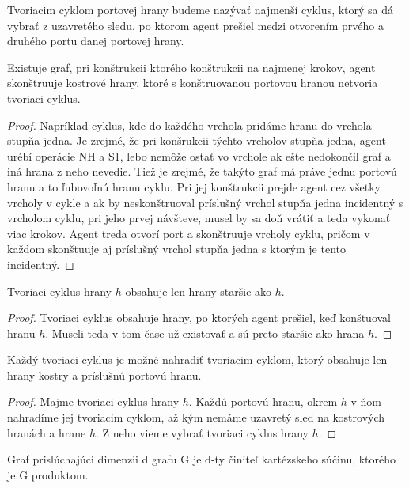 \begin{ozn}
Tvoriacim cyklom portovej hrany budeme nazývať najmenší cyklus, ktorý sa dá vybrať z
uzavretého sledu, po ktorom agent prešiel medzi otvorením prvého a druhého
portu danej portovej hrany.
\end{ozn}

\begin{lem}
Existuje graf, pri konštrukcii ktorého konštrukcii na najmenej krokov, agent
skonštruuje kostrové hrany, ktoré s konštruovanou portovou hranou netvoria
tvoriaci cyklus.
\end{lem}
\begin{proof}
Napríklad cyklus, kde do každého vrchola pridáme hranu do vrchola stupňa
jedna. Je zrejmé, že pri konšrukcii týchto vrcholov stupňa jedna, agent
urébí operácie NH a S1, lebo nemôže ostať vo vrchole ak ešte nedokončil graf
a iná hrana z neho nevedie. Tiež je zrejmé, že takýto graf má práve jednu
portovú hranu a to ľubovoľnú hranu cyklu. Pri jej konštrukcii prejde agent
cez všetky vrcholy v cykle a ak by neskonštruoval príslušný vrchol stupňa
jedna incidentný s vrcholom cyklu, pri jeho prvej návšteve, musel by sa doň
vrátiť a teda vykonať viac krokov. Agent treda otvorí port a skonštruuje
vrcholy cyklu, pričom v každom skonštuuje aj príslušný vrchol stupňa jedna s
ktorým je tento incidentný.
\end{proof}

\begin{lem}
Tvoriaci cyklus hrany $h$ obsahuje len hrany staršie ako $h$.
\end{lem}
\begin{proof}
Tvoriaci cyklus obsahuje hrany, po ktorých agent prešiel, keď konštuoval
hranu $h$. Museli teda v tom čase už existovať a sú preto staršie ako hrana
$h$.
\end{proof}


\begin{lem}
Každý tvoriaci cyklus je možné nahradiť tvoriacim cyklom, ktorý obsahuje len
hrany kostry a príslušnú portovú hranu.
\end{lem}
\begin{proof}
Majme tvoriaci cyklus hrany $h$. Každú portovú hranu, okrem $h$  v ňom nahradíme jej tvoriacim
cyklom, až kým nemáme uzavretý sled na kostrových hranách a hrane $h$. Z
neho vieme vybrať tvoriaci cyklus hrany $h$.
\end{proof}

\begin{ozn}
Graf prislúchajúci dimenzii d grafu G je d-ty činiteľ kartézskeho súčinu, ktorého
je G produktom.
\end{ozn}

